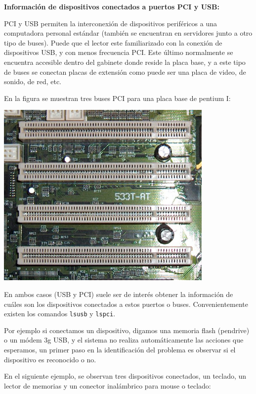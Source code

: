 \documentclass[12pt]{article}
\begin{document}
\textbf{Información de dispositivos conectados a puertos PCI y USB:}

PCI y USB permiten la interconexión de dispositivos periféricos a una computadora 
personal estándar (también se encuentran en servidores junto a otro tipo de buses). 
Puede que el lector este familiarizado con la conexión de 
dispositivos USB, y con menos frecuencia PCI. Este último normalmente se encuentra 
accesible dentro del gabinete donde reside la placa base, y a este tipo de buses se
conectan placas de extensión como puede ser una placa de video, de sonido, de red, etc.   

En la figura se muestran tres buses PCI para una placa base de pentium I:

\begin{center}
 \includegraphics{Bus_pci.jpg}
\end{center}

En ambos casos (USB y PCI) suele ser de interés obtener la información de cuáles son 
los dispositivos conectados a estos puertos o buses. Convenientemente existen los 
comandos \texttt{lsusb} y \texttt{lspci}. 

Por ejemplo si conectamos un dispositivo, digamos una memoria flash (pendrive) o un 
módem 3g USB, y el sistema no realiza automáticamente las acciones que esperamos, un primer paso en la 
identificación del problema es observar si el dispositivo es reconocido o no. 

En el siguiente ejemplo, se observan tres dispositivos conectados, un teclado, 
un lector de memorias y un conector inalámbrico para mouse o teclado: 
 
\end{document}
